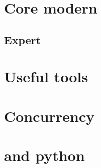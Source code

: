 \documentclass[compress]{beamer}
\begin{document}
\section[More]{Core modern \cpp}

\begin{advanced}
  
\end{advanced}

\begin{advanced}
  
  
\end{advanced}



\begin{advanced}
  
  
  
\end{advanced}

\begin{advanced}
  
\end{advanced}

\begin{advanced}
  \section[exp]{Expert \cpp}
  
  
  
  
  
  
  
\end{advanced}

\section[Tool]{Useful tools}






\begin{advanced}
  
  
  
  
  

  \section[conc]{Concurrency}
  
  
  
  
  

  \section[py]{\cpp and python}
  
  
  
  
\end{advanced}
\end{document}
